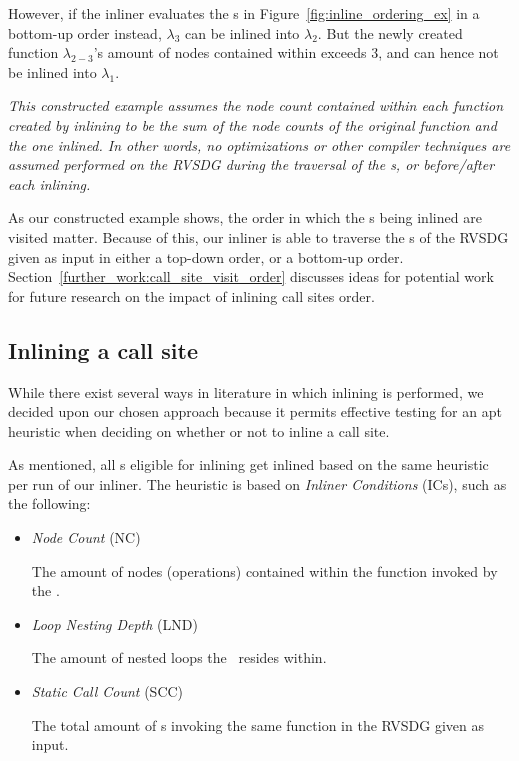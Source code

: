 However, if the inliner evaluates the \applyNode s in
Figure~\ref{fig:inline_ordering_ex} in a bottom-up order instead, $\lambda_3$
can be inlined into $\lambda_2$. But the newly created function
$\lambda_{2-3}$'s amount of nodes contained within exceeds 3, and can hence not
be inlined into $\lambda_1$.

\textit{This constructed example assumes the node count contained within each
function created by inlining to be the sum of the node counts of the original
function and the one inlined. In other words, no optimizations or other compiler
techniques are assumed performed on the RVSDG during the traversal of the
\applyNode s, or before/after each inlining.}

As our constructed example shows, the order in which the \applyNode s being
inlined are visited matter. Because of this, our inliner is able to traverse the
\applyNode s of the RVSDG given as input in either a top-down order, or a
bottom-up order. Section~\ref{further_work:call_site_visit_order} discusses
ideas for potential work for future research on the impact of inlining call
sites order.

\subsection{Inlining a call site}
\label{sub:scheme:inlining_apply_nodes}

While there exist several\cite{GHCPaper}\cite{AdaptvStratInlSubst} ways in
literature in which inlining is performed, we decided upon our chosen
approach\cite{AdaptvCompilAndInlingWaterman} because it permits effective
testing for an apt heuristic when deciding on whether or not to inline a call
site.

As mentioned, all \applyNode s eligible for inlining get inlined based on the
same heuristic per run of our inliner. The heuristic is based on \textit{Inliner
Conditions} (ICs), such as the following:


\begin{itemize}
	\item \textit{Node Count} (NC)

The amount of nodes (operations) contained within the function invoked by the
\applyNode .

	\item \textit{Loop Nesting Depth} (LND)

The amount of nested loops the \applyNode~resides within.

	\item \textit{Static Call Count} (SCC)

The total amount of \applyNode s invoking the same function in the RVSDG given
as input.
\end{itemize}

